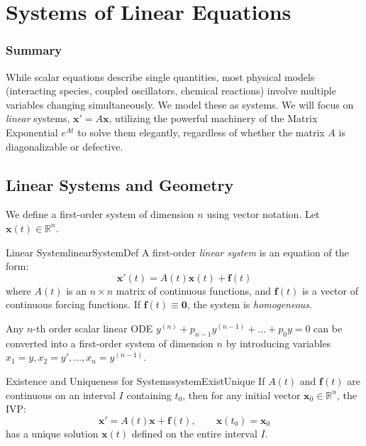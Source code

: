 \documentclass{book}
\newcommand{\R}{{\mathbb{R}}}
\begin{document}
\chapter{Systems of Linear Equations}\label{cha:systems}

\subsection*{Summary}
While scalar equations describe single quantities, most physical models (interacting species, coupled oscillators, chemical reactions) involve multiple variables changing simultaneously. We model these as systems. We will focus on \emph{linear} systems, $\mathbf{x}' = A\mathbf{x}$, utilizing the powerful machinery of the Matrix Exponential $e^{At}$ to solve them elegantly, regardless of whether the matrix $A$ is diagonalizable or defective.

\section{Linear Systems and Geometry}

We define a first-order system of dimension $n$ using vector notation. Let $\mathbf{x}(t) \in \R^n$.

\begin{defn}{Linear System}{linearSystemDef}
    A first-order \emph{linear system} is an equation of the form:
    \[
        \mathbf{x}'(t) = A(t)\mathbf{x}(t) + \mathbf{f}(t)
    \]
    where $A(t)$ is an $n \times n$ matrix of continuous functions, and $\mathbf{f}(t)$ is a vector of continuous forcing functions. If $\mathbf{f}(t) \equiv \mathbf{0}$, the system is \emph{homogeneous}.
\end{defn}

Any $n$-th order scalar linear ODE $y^{(n)} + p_{n-1}y^{(n-1)} + \dots + p_0 y = 0$ can be converted into a first-order system of dimension $n$ by introducing variables $x_1 = y, x_2 = y', \dots, x_n = y^{(n-1)}$.

\begin{thm}{Existence and Uniqueness for Systems}{systemExistUnique}
    If $A(t)$ and $\mathbf{f}(t)$ are continuous on an interval $I$ containing $t_0$, then for any initial vector $\mathbf{x}_0 \in \R^n$, the IVP:
    \[
        \mathbf{x}' = A(t)\mathbf{x} + \mathbf{f}(t), \qquad \mathbf{x}(t_0) = \mathbf{x}_0
    \]
    has a unique solution $\mathbf{x}(t)$ defined on the entire interval $I$.
\end{thm}
\end{document}
